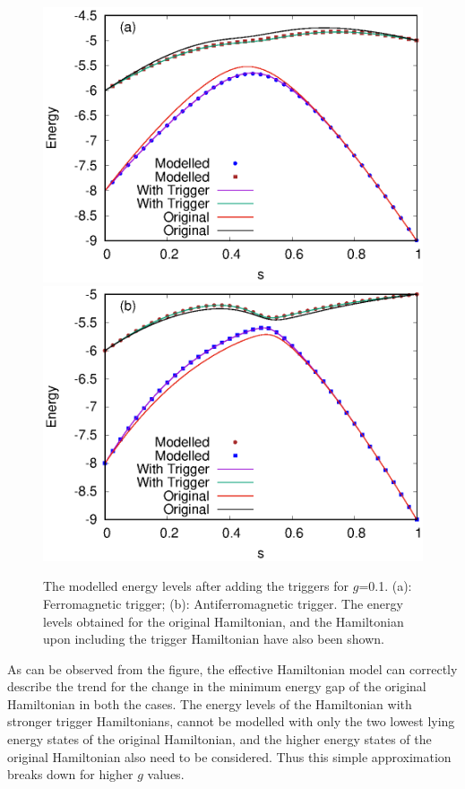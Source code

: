 \documentclass[../main.tex]{subfiles}
\begin{document}
\begin{appendices}
\begin{figure}
\centering 
\includegraphics[scale=0.8]{98_Ferro_g0.eps}
\includegraphics[scale=0.8]{59_antiFerro_g0.eps}
\caption{The modelled energy levels after adding the triggers for $g$=0.1. (a): Ferromagnetic trigger; (b): Antiferromagnetic trigger. The energy levels obtained for the original Hamiltonian, and the Hamiltonian upon including the trigger Hamiltonian have also been shown.}
\label{fig:ap8}
\end{figure}
As can be observed from the figure, the effective Hamiltonian model can correctly describe the trend for the change in the minimum energy gap of the original Hamiltonian in both the cases. The energy levels of the Hamiltonian with stronger trigger Hamiltonians, cannot be modelled with only the two lowest lying energy states of the original Hamiltonian, and the higher energy states of the original Hamiltonian also need to be considered. Thus this simple approximation breaks down for higher $g$ values.

\end{appendices}
\end{document}
